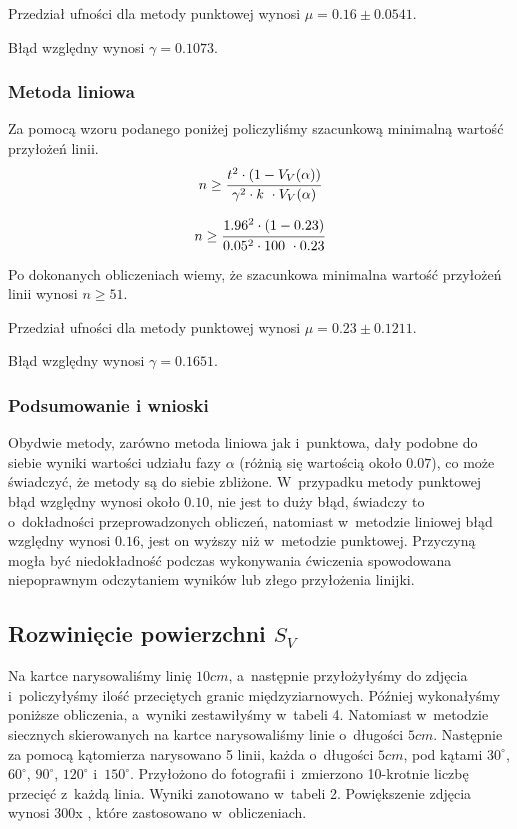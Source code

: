 \documentclass[a4paper,12pt]{article}
\begin{document}


Przedział ufności dla metody punktowej wynosi $\mu=0.16\pm 0.0541$.

Błąd względny wynosi $\gamma=0.1073$.
\newpage

\subsubsection{Metoda liniowa}

{\color{blue} Za pomocą wzoru podanego poniżej policzyliśmy szacunkową minimalną wartość przyłożeń linii.
$$n\ge \cfrac{t^2 \cdot (1-V_V(\alpha))}{\gamma^2 \cdot k~\cdot V_V(\alpha)}$$

$$n\ge \cfrac{1.96^2 \cdot (1-0.23)}{0.05^2 \cdot 100~\cdot 0.23}$$
}

Po dokonanych obliczeniach wiemy, że szacunkowa minimalna wartość przyłożeń linii wynosi $n\ge 51$.



Przedział ufności dla metody punktowej wynosi $\mu=0.23\pm 0.1211$.

Błąd względny wynosi $\gamma=0.1651$.
\newpage

{\color{purple}
\subsubsection{Podsumowanie i wnioski}



Obydwie metody, zarówno metoda liniowa jak i~punktowa, dały podobne  do siebie wyniki wartości udziału fazy $\alpha$ (różnią się wartością około $0.07$), co może świadczyć, że metody są do siebie zbliżone. W~przypadku metody punktowej błąd względny wynosi  około $0.10$, nie jest to duży błąd, świadczy to  o~dokładności przeprowadzonych obliczeń, natomiast w~metodzie liniowej błąd względny wynosi  $0.16$, jest on wyższy niż w~metodzie punktowej. Przyczyną mogła być niedokładność  podczas wykonywania  ćwiczenia spowodowana niepoprawnym odczytaniem wyników lub złego przyłożenia linijki.}
\newpage

\subsection{Rozwinięcie powierzchni $S_V$}

Na kartce narysowaliśmy linię $10cm$, a~następnie przyłożyłyśmy do zdjęcia i~policzyłyśmy ilość przeciętych granic międzyziarnowych. Później wykonałyśmy poniższe obliczenia, a~wyniki zestawiłyśmy w~tabeli 4.  Natomiast w~metodzie siecznych skierowanych na kartce narysowaliśmy linie o~długości $5cm$. Następnie za pomocą kątomierza narysowano 5 linii, każda o~długości $5cm$, pod kątami $30^\circ$, $60^\circ$, $90^\circ$, $120^\circ$ i~$150^\circ$. Przyłożono do fotografii i~zmierzono 10-krotnie liczbę przecięć z~każdą linia. Wyniki zanotowano w~tabeli 2.
Powiększenie zdjęcia  wynosi 300x , które zastosowano w~obliczeniach.
\newline
\end{document}
